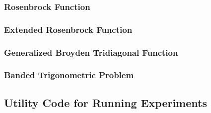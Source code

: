 \documentclass[a4paper,12pt]{article}
\begin{document}
	\subsubsection{Rosenbrock Function}
	\subsubsection{Extended Rosenbrock Function}
	\subsubsection{Generalized Broyden Tridiagonal Function}
	\subsubsection{Banded Trigonometric Problem}
	\subsection{Utility Code for Running Experiments}
	
\end{document}
